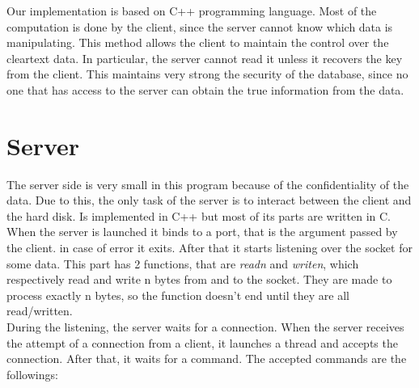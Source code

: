 Our implementation is based on C++ programming language. Most of the computation is done by the client, since the server cannot know which data is manipulating. This method allows the client to maintain the control over the cleartext data. In particular, the server cannot read it unless it recovers the key from the client. This maintains very strong the security of the database, since no one that has access to the server can obtain the true information from the data.

\section{Server}
The server side is very small in this program because of the confidentiality of the data. Due to this, the only task of the server is to interact between the client and the hard disk.
Is implemented in C++ but most of its parts are written in C. \\
When the server is launched it binds to a port, that is the argument passed by the client. in case of error it exits. After that it starts listening over the socket for some data. This part has 2 functions, that are \emph{readn} and \emph{writen}, which respectively read and write n bytes from and to the socket. They are made to process exactly n bytes, so the function doesn't end until they are all read/written.\\
During the listening, the server waits for a connection. When the server receives the attempt of a connection from a client, it launches a thread and accepts the connection. After that, it waits for a command. The accepted commands are the followings:
